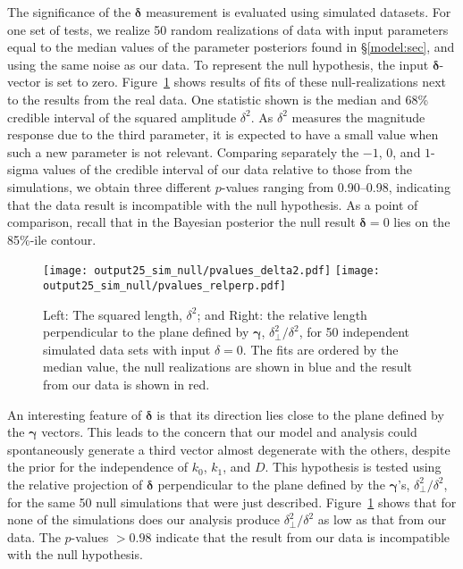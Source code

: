 \documentclass{aastex61}   	%
\begin{document}
The significance of the $\pmb{\delta}$ measurement is evaluated using simulated datasets.
For one set of tests, we realize 50 random realizations of data with input  parameters equal to the median values of the 
parameter posteriors found in
\S\ref{model:sec}, and using the same noise as our data.  To represent the null hypothesis, the input $\pmb{\delta}$-vector is set to zero.
Figure~\ref{pvalues_delta2:fig} shows results of fits of these null-realizations next  to the results from the real data.
One statistic shown is the median and 68\% credible interval of the squared amplitude  $\delta^2$.
As $\delta^2$ measures the magnitude response due to the third parameter, it is expected to have a small value
when such a new parameter is not relevant.
Comparing separately the  $-1$, 0, and $1$-sigma
values of  the credible interval of our data relative to those from the simulations, we obtain
three different $p$-values ranging from 0.90--0.98, indicating that the data result is incompatible with the null hypothesis. 
As a point of comparison, recall that in the Bayesian posterior
the null result
$\pmb{\delta}=0$ lies on the 85\%-ile contour.

\begin{figure}[htbp] %
   \centering
   \texttt{[image: output25\_sim\_null/pvalues\_delta2.pdf]} 
  \texttt{[image: output25\_sim\_null/pvalues\_relperp.pdf]} 
            \caption{ Left: The squared length, $\delta^2$;  and Right: the relative length perpendicular to the plane defined by $\pmb{\gamma}$, $\delta_\perp^2/\delta^2$, for 50 independent simulated data sets with input $\delta=0$.  The fits
            are ordered by the median value, the null realizations are shown in blue and the result from our data is shown in red.
            \label{pvalues_delta2:fig}}
\end{figure}

An interesting feature of $\pmb{\delta}$ is that its direction lies close to the plane defined by the
$\pmb{\gamma}$ vectors.
This leads to the concern that our model and analysis  could spontaneously generate a third
vector almost degenerate with the others, despite the prior for the independence of $k_0$, $k_1$, and $D$.
This hypothesis is tested using the 
relative projection of $\pmb{\delta}$  perpendicular to the plane defined by the $\pmb{\gamma}$'s, $\delta_\perp^2/\delta^2$,
for the same 50 null simulations that were just described.
Figure~\ref{pvalues_delta2:fig} shows  that for none of the simulations does our analysis produce 
 $\delta_\perp^2/\delta^2$ as low as that from our data.  The $p$-values $>0.98$ indicate that the result from our data
 is incompatible with the null hypothesis.
\end{document}
